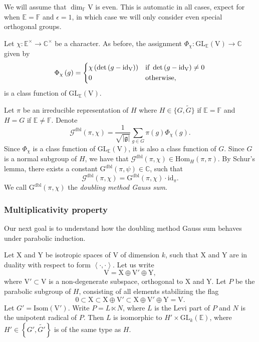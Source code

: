 \documentclass[12pt, reqno]{amsart}
\theoremstyle{definition}
\theoremstyle{definition}
\theoremstyle{definition}
\newcommand{\cComplex}{\mathbb{C}}
\newcommand{\multiplicativegroup}[1]{#1^{\times}}
\newcommand{\Hom}{\mathrm{Hom}}
\newcommand{\idmap}{\mathrm{id}}
\newcommand{\sizeof}[1]{\left|#1\right|}
\newcommand{\hermitianSpace}{\mathrm{V}}
\newcommand{\xIsotropic}{\mathrm{X}}
\newcommand{\yIsotropic}{\mathrm{Y}}
\newcommand{\innerproduct}[2]{\left\langle #1,#2\right\rangle}
\newcommand{\fieldCharacter}{\psi}
\newcommand{\GL}{\mathrm{GL}}
\newcommand{\GroupExtension}[1]{\widetilde{#1}}
\newcommand{\finiteField}{\mathbb{F}}
\newcommand{\quadraticExtension}{\mathbb{E}}
\newcommand{\dblGaussSum}[2]{\mathcal{G}^{\mathrm{dbl}}\left(#1, #2\right)}
\newcommand{\dblGaussSumScalar}[2]{\mathrm{G}^{\mathrm{dbl}}\left(#1, #2\right)}
\newcommand{\IsometryGroup}{\mathrm{Isom}}
\newcommand{\lieAlgebra}{\mathfrak{g}}
\begin{document}
We will assume that $\dim_{\finiteField} \hermitianSpace$ is even. This is automatic in all cases, expect for when $\quadraticExtension = \finiteField$ and $\epsilon = 1$, in which case we will only consider even special orthogonal groups.

Let $\chi \colon \multiplicativegroup{\quadraticExtension} \to \multiplicativegroup{\cComplex}$ be a character. As before, the assignment $\Phi_{\chi} \colon \GL_{\quadraticExtension}\left(\hermitianSpace\right) \to \cComplex$ given by $$\Phi_{\chi}\left(g\right) = \begin{dcases}
\chi\left(\det\left(g - \idmap_{\hermitianSpace}\right)\right) & \text{if }\det\left(g - \idmap_{\hermitianSpace}\right) \ne 0\\
0 & \text{otherwise,}
\end{dcases}$$
is a class function of $\GL_{\quadraticExtension}\left(\hermitianSpace\right)$.

Let $\pi$ be an irreducible representation of $H$ where $H \in \{G, \GroupExtension{G}\}$ if $\quadraticExtension = \finiteField$ and $H = G$ if $\quadraticExtension \ne \finiteField$. Denote $$\dblGaussSum{\pi}{\chi} = \frac{1}{\sqrt{\sizeof{\lieAlgebra}}} \sum_{g \in G} \pi\left(g\right) \Phi_{\chi}\left(g\right).$$
Since $\Phi_{\chi}$ is a class function of $\GL_{\quadraticExtension}\left(\hermitianSpace\right)$, it is also a class function of $G$. Since $G$ is a normal subgroup of $H$, we have that $\dblGaussSum{\pi}{\chi} \in \Hom_{H}\left(\pi, \pi\right)$. By Schur's lemma, there exists a constant $\dblGaussSumScalar{\pi}{\fieldCharacter} \in \cComplex$, such that $$\dblGaussSum{\pi}{\chi} = \dblGaussSumScalar{\pi}{\chi} \cdot \idmap_\pi.$$
We call $\dblGaussSumScalar{\pi}{\chi}$ the \emph{doubling method Gauss sum}.

\subsubsection{Multiplicativity property}
Our next goal is to understand how the doubling method Gauss sum behaves under parabolic induction.

Let $\xIsotropic$ and $\yIsotropic$ be isotropic spaces of $\hermitianSpace$ of dimension $k$, such that $\xIsotropic$ and $\yIsotropic$ are in duality with respect to form $\innerproduct{\cdot}{\cdot}$. Let us write $$\hermitianSpace = \xIsotropic \oplus \hermitianSpace' \oplus \yIsotropic,$$
where $\hermitianSpace' \subset \hermitianSpace$ is a non-degenerate subspace, orthogonal to $\xIsotropic$ and $\yIsotropic$. Let $P$ be the parabolic subgroup of $H$, consisting of all elements stabilizing the flag $$0 \subset \xIsotropic \subset \xIsotropic \oplus \hermitianSpace' \subset \xIsotropic \oplus \hermitianSpace' \oplus \yIsotropic = \hermitianSpace.$$
Let $G' = \IsometryGroup\left(\hermitianSpace'\right)$. Write $P = L \ltimes N$, where $L$ is the Levi part of $P$ and $N$ is the unipotent radical of $P$. Then $L$ is isomorphic to $H' \times \GL_k\left(\quadraticExtension\right)$, where $H' \in \left\{G',\GroupExtension{G'}\right\}$ is of the same type as $H$. 
\end{document}
